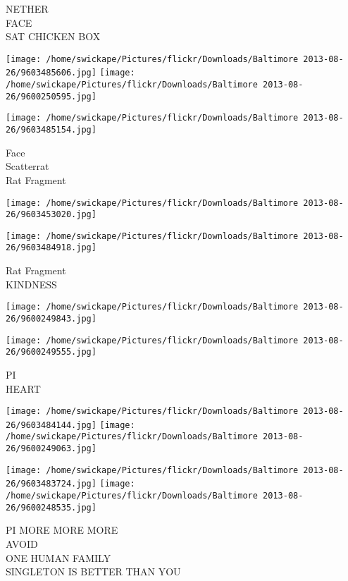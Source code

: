 \documentclass[10pt,letterpaper]{article}
\begin{document}
NETHER\\
FACE\\
SAT CHICKEN BOX\\
\pagebreak

\texttt{[image: /home/swickape/Pictures/flickr/Downloads/Baltimore 2013-08-26/9603485606.jpg]}
\texttt{[image: /home/swickape/Pictures/flickr/Downloads/Baltimore 2013-08-26/9600250595.jpg]}

\texttt{[image: /home/swickape/Pictures/flickr/Downloads/Baltimore 2013-08-26/9603485154.jpg]}

Face\\
Scatterrat\\
Rat Fragment\\
\pagebreak

\texttt{[image: /home/swickape/Pictures/flickr/Downloads/Baltimore 2013-08-26/9603453020.jpg]}

\vspace{0.25in}
\texttt{[image: /home/swickape/Pictures/flickr/Downloads/Baltimore 2013-08-26/9603484918.jpg]}

Rat Fragment\\
KINDNESS\\
\pagebreak

\texttt{[image: /home/swickape/Pictures/flickr/Downloads/Baltimore 2013-08-26/9600249843.jpg]}

\vspace{0.25in}
\texttt{[image: /home/swickape/Pictures/flickr/Downloads/Baltimore 2013-08-26/9600249555.jpg]}

PI\\
HEART\\
\pagebreak

\texttt{[image: /home/swickape/Pictures/flickr/Downloads/Baltimore 2013-08-26/9603484144.jpg]}
\texttt{[image: /home/swickape/Pictures/flickr/Downloads/Baltimore 2013-08-26/9600249063.jpg]}

\texttt{[image: /home/swickape/Pictures/flickr/Downloads/Baltimore 2013-08-26/9603483724.jpg]}
\texttt{[image: /home/swickape/Pictures/flickr/Downloads/Baltimore 2013-08-26/9600248535.jpg]}

PI MORE MORE MORE\\
AVOID\\
ONE HUMAN FAMILY\\
SINGLETON IS BETTER THAN YOU\\
\pagebreak
\end{document}
